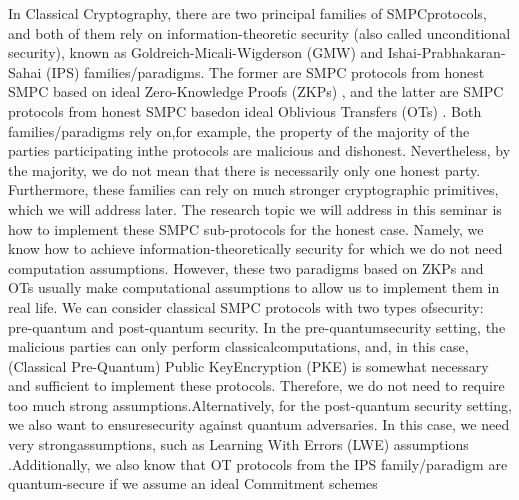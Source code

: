 \documentclass[12pt]{article}
\begin{document}
    \noindent In Classical Cryptography, there are two principal families of SMPC\break protocols, and both of them rely on information-theoretic security (also called unconditional security), known as Goldreich-Micali-Wigderson (GMW) \cite{goldreich-micali-wigderson:how-play-any-mental-game:1987:03-2024} and Ishai-Prabhakaran-Sahai (IPS) \cite{ishai-prabhakaran-sahai:founding-cryptography-oblivious-transfer-efficiently:2008:03-2024} families/paradigms. The former are SMPC protocols from honest SMPC based on ideal Zero-Knowledge Proofs (ZKPs) \cite{goldwasser-micali-rackoff:1985:03-2024,fiat-shamir:how-prove-yourself-practical-solutions-identification-signature-problems:1987:03-2024,blum-feldman-micali:non-interactive-zero-knowledge-applications:1988:03-2024}, and the latter are SMPC protocols from honest SMPC based\break on ideal Oblivious Transfers (OTs) \cite{rabin:how-exchange-secrets-oblivious-transfer:1981:03-2024,even-goldreich-lempel:randomized-protocol-signing-contracts:1985:03-2024,crepeau:equivalence-between-two-flavours-oblivious-transfers:1988:03-2024,kilian:founding-cryptography-oblivious-transfer:1988:03-2024}. Both families/paradigms rely on,\break for example, the property of the majority of the parties participating in\break the protocols are malicious and dishonest. Nevertheless, by the majority, we do not mean that there is necessarily only one honest party. Furthermore, these families can rely on much stronger cryptographic primitives, which we will address later. The research topic we will address in this seminar is how to implement these SMPC sub-protocols for the honest case. Namely, we know how to achieve information-theoretically security for which we do not need computation assumptions. However, these two paradigms based on ZKPs and OTs usually make computational assumptions to allow us to implement them in real life. We can consider classical SMPC protocols with two types of\break security: pre-quantum and post-quantum security. In the pre-quantum\break security setting, the malicious parties can only perform classical\break computations, and, in this case, (Classical Pre-Quantum) Public Key\break Encryption (PKE) is somewhat necessary and sufficient to implement these protocols. Therefore, we do not need to require too much strong assumptions.\break Alternatively, for the post-quantum security setting, we also want to ensure\break security against quantum adversaries. In this case, we need very strong\break assumptions, such as Learning With Errors (LWE) assumptions \cite{regev:lattices-learning-with-errors-random-linear-codes-cryptography:2009:03-2024,bendlin-damgard-olrandi-zakarias:semi-homomorphic-encryption-and-multiparty-computation:2011:03-2024,asharov-et-al:multiparty-computation-low-communication-computation-interaction-threshold-fhe:2012:03-2024,buchmann-et-al:creating-cryptographic-challenges-using-multi-party-computation-lwe-challenge:2016:03-2024,mukherjee-wichs:two-round-multiparty-computation-multi-key-fhe:2016:03-2024}.\break Additionally, we also know that OT protocols from the IPS family/paradigm \cite{ishai-prabhakaran-sahai:founding-cryptography-oblivious-transfer-efficiently:2008:03-2024} are quantum-secure if we assume an ideal Commitment schemes 
\end{document}

